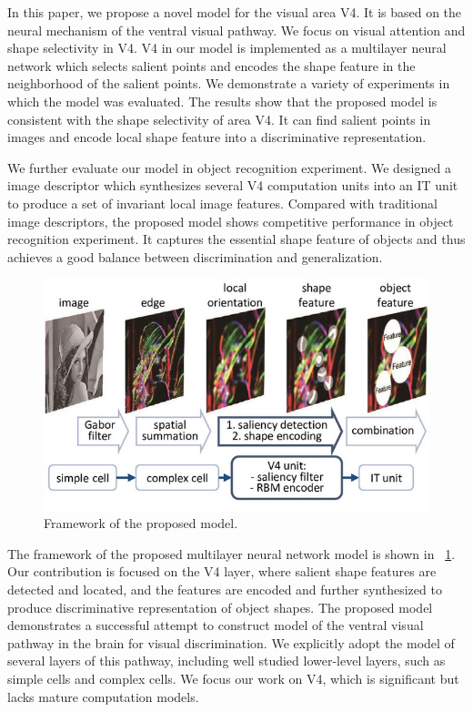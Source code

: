 \documentclass[twocolumn]{article}
\begin{document}
In this paper, we propose a novel model for the visual area V4.
It is based on the neural mechanism of the ventral visual pathway.
We focus on visual attention and shape selectivity in V4.
V4 in our model is implemented as a multilayer neural network 
which selects salient points and encodes the shape feature in the neighborhood of the salient points.
We demonstrate a variety of experiments in which the model was evaluated.
The results show that the proposed model is consistent with the shape selectivity of area V4.
It can find salient points in images and encode local shape feature into a discriminative representation.

We further evaluate our model in object recognition experiment.
We designed a image descriptor which synthesizes several V4 computation units
into an IT unit to produce a set of invariant local image features.
Compared with traditional image descriptors,
the proposed model shows competitive performance in object recognition experiment. 
It captures the essential shape feature of objects
and thus achieves a good balance between discrimination and generalization.

\begin{figure}
\centering
\includegraphics[width=0.9\linewidth]{images/fig-17.jpg}
\caption{Framework of the proposed model.}
\label{fig:17}
\end{figure}

The framework of the proposed multilayer neural network model is shown in \figurename~\ref{fig:17}.
Our contribution is focused on the V4 layer,
where salient shape features are detected and located,
and the features are encoded and further synthesized to produce discriminative representation of object shapes.
The proposed model demonstrates a successful attempt to construct model of the ventral visual pathway
in the brain for visual discrimination.
We explicitly adopt the model of several layers of this pathway,
including well studied lower-level layers, such as simple cells and complex cells.
We focus our work on V4, which is significant but lacks mature computation models.
\end{document}
